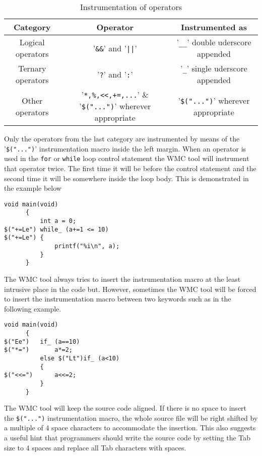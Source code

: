 \begin{table}[!hb]
\centering\small
\caption{Instrumentation of operators}
\begin{tabular}{|c|c|c|} 
\hline
\textbf{Category} & \textbf{Operator} & \textbf{Instrumented as} \\
\hline
Logical operators & '\verb|&&|' and '\verb$||$' & '\verb|__|' double uderscore appended \\
\hline
Ternary operators & '\verb|?|' and '\verb|:|' & '\verb|_|' single uderscore appended \\
\hline
Other operators & '\verb|*,%,<<,+=,...|' & '\verb|$("...")|' wherever appropriate \\
\hline
\end{tabular}
\label{tab:instrumentation_of_operators}
\end{table}

Only the operators from the last category are instrumented by means of the '\verb|$("...")|' instrumentation macro inside the left margin. When an operator is used in the \verb|for| or \verb|while| loop control statement the WMC tool will instrument that operator twice. The first time it will be before the control statement and the second time it will be somewhere inside the loop body. This is demonstrated in the example below

\begin{Verbatim}[fontsize=\small]
      void main(void)
      {
          int a = 0;
$("+=Le") while_ (a+=1 <= 10)
$("+=Le") {
              printf("%i\n", a);
          }
      }
\end{Verbatim}

The WMC tool always tries to insert the instrumentation macro at the least intrusive place in the code but. However, sometimes the WMC tool will be forced to insert the instrumentation macro between two keywords such as in the following example.

\begin{Verbatim}[fontsize=\small]
      void main(void)
      {
$("Ee")   if_ (a==10)
$("*=")       a*=2;
          else $("Lt")if_ (a<10)
          {
$("<<=")      a<<=2;
          }
      }
\end{Verbatim}

The WMC tool will keep the source code aligned. If there is no space to insert the \verb|$("...")| instrumentation macro, the whole source file will be right shifted by a multiple of 4 space characters to accommodate the insertion. This also suggests a useful hint that programmers should write the source code by setting the Tab size to 4 spaces and replace all Tab characters with spaces.

